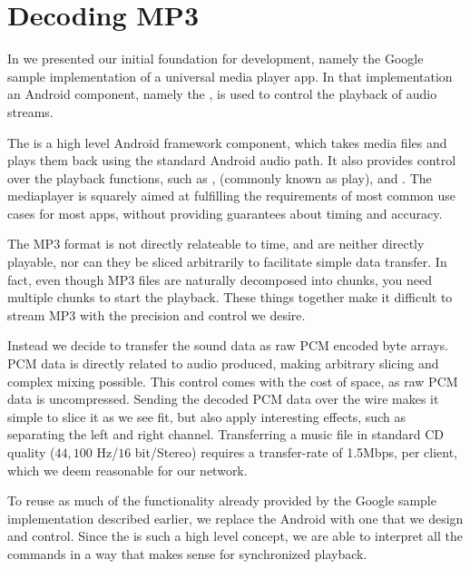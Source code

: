 \section{Decoding MP3}

In  we presented our initial
foundation for development, namely the Google sample implementation of
a universal media player app. In that implementation an Android
component, namely the , is used to
control the playback of audio streams.

The  is a high level Android framework component,
which takes media files and plays them back using the standard Android
audio path. It also provides control over the playback functions, such
as ,  (commonly known as play), and
. The mediaplayer is squarely aimed at fulfilling the
requirements of most common use cases for most apps, without providing
guarantees about timing and accuracy.

The MP3 format is not directly relateable to time, and are
neither directly playable, nor can they be sliced arbitrarily to
facilitate simple data transfer. In fact, even though MP3 files are
naturally decomposed into chunks, you need multiple chunks to start the
playback. These things together make it difficult to stream MP3 with the
precision and control we desire.

Instead we decide to transfer the sound data as raw \ac{PCM} encoded
byte arrays. \ac{PCM} data is directly related to audio produced, making
arbitrary slicing and complex mixing possible. This control comes with the cost of space,
as raw \ac{PCM} data is uncompressed. Sending the decoded
\ac{PCM} data over the wire makes it simple to slice it as we see fit,
but also apply interesting effects, such as separating the left and
right channel.
Transferring a music file in standard CD quality
($44,100$ Hz/$16$ bit/Stereo) requires a transfer-rate of 1.5Mbps, per
client, which we deem reasonable for our network.

To reuse as much of the functionality already provided by the Google sample implementation described earlier, we
replace the Android  with one that we design and
control. Since the  is such a high level concept, we
are able to interpret all the commands in a way that makes sense for
synchronized playback.

